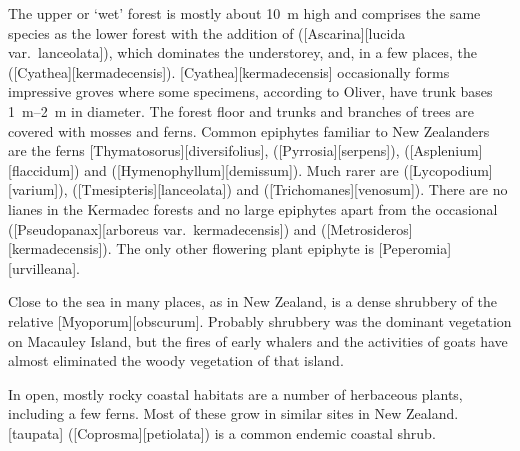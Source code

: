 The upper or `wet' forest is mostly about \SI{10}{\metre} high and comprises the same species as the lower forest with the addition of  ([Ascarina][lucida var.\ lanceolata]), which dominates the understorey, and, in a few places, the  ([Cyathea][kermadecensis]).
[Cyathea][kermadecensis] occasionally forms impressive groves where some specimens, according to Oliver, have trunk bases \SIrange{1}{2}{\metre} in diameter.
The forest floor and trunks and branches of trees are covered with mosses and ferns.
Common epiphytes familiar to New Zealanders are the ferns [Thymatosorus][diversifolius],  ([Pyrrosia][serpens]),  ([Asplenium][flaccidum]) and  ([Hymenophyllum][demissum]).
Much rarer are  ([Lycopodium][varium]),  ([Tmesipteris][lanceolata]) and  ([Trichomanes][venosum]).
There are no lianes in the Kermadec forests and no large epiphytes apart from the occasional  ([Pseudopanax][arboreus var.\ kermadecensis]) and  ([Metrosideros][kermadecensis]).
The only other flowering plant epiphyte is [Peperomia][urvilleana].

Close to the sea in many places, as in New Zealand, is a dense shrubbery of the  relative [Myoporum][obscurum].
Probably  shrubbery was the dominant vegetation on Macauley Island, but the fires of early whalers and the activities of goats have almost eliminated the woody vegetation of that island.

In open, mostly rocky coastal habitats are a number of herbaceous plants, including a few ferns.
Most of these grow in similar sites in New Zealand.
[taupata] ([Coprosma][petiolata]) is a common endemic coastal shrub.

